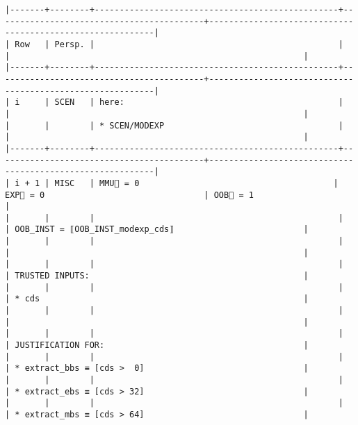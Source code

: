 \documentclass[varwidth=\maxdimen,margin=0.5cm,multi={verbatim}]{standalone}
\begin{document}
\begin{verbatim}
|-------+--------+-------------------------------------------------+------------------------------------------+-----------------------------------------------------------|
| Row   | Persp. |                                                 |                                          |                                                           |
|-------+--------+-------------------------------------------------+------------------------------------------+-----------------------------------------------------------|
| i     | SCEN   | here:                                           |                                          |                                                           |
|       |        | * SCEN/MODEXP                                   |                                          |                                                           |
|-------+--------+-------------------------------------------------+------------------------------------------+-----------------------------------------------------------|
| i + 1 | MISC   | MMU🏴 = 0                                       | EXP🏴 = 0                                | OOB🏴 = 1                                                 |
|       |        |                                                 |                                          | OOB_INST = ⟦OOB_INST_modexp_cds⟧                          |
|       |        |                                                 |                                          |                                                           |
|       |        |                                                 |                                          | TRUSTED INPUTS:                                           |
|       |        |                                                 |                                          | * cds                                                     |
|       |        |                                                 |                                          |                                                           |
|       |        |                                                 |                                          | JUSTIFICATION FOR:                                        |
|       |        |                                                 |                                          | * extract_bbs ≡ [cds >  0]                                |
|       |        |                                                 |                                          | * extract_ebs ≡ [cds > 32]                                |
|       |        |                                                 |                                          | * extract_mbs ≡ [cds > 64]                                |

\end{verbatim}
\end{document}
